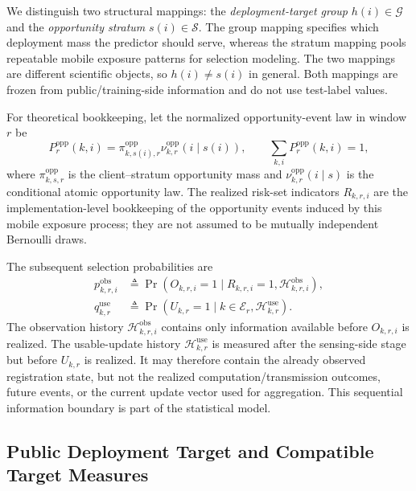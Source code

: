 \documentclass[letterpaper,journal]{IEEEtran}
\begin{document}
We distinguish two structural mappings: the \emph{deployment-target
group} $h(i)\in\mathcal{G}$ and the \emph{opportunity stratum}
$s(i)\in\mathcal{S}$.  The group mapping specifies which deployment
mass the predictor should serve, whereas the stratum mapping pools
repeatable mobile exposure patterns for selection modeling.  The two
mappings are different scientific objects, so $h(i)\neq s(i)$ in
general.  Both mappings are frozen from public/training-side
information and do not use test-label values.

For theoretical bookkeeping, let the normalized opportunity-event law in
window $r$ be
\begin{equation}
 P_r^{\mathrm{opp}}(k,i)
 =
 \pi^{\mathrm{opp}}_{k,s(i),r}
 \nu^{\mathrm{opp}}_{k,r}(i\mid s(i)),
 \qquad
 \sum_{k,i}P_r^{\mathrm{opp}}(k,i)=1,
 \label{eq:opp_event_law}
\end{equation}
where $\pi^{\mathrm{opp}}_{k,s,r}$ is the client--stratum opportunity mass and
$\nu^{\mathrm{opp}}_{k,r}(i\mid s)$ is the conditional atomic opportunity law.
The realized risk-set indicators $R_{k,r,i}$ are the implementation-level
bookkeeping of the opportunity events induced by this mobile exposure process;
they are not assumed to be mutually independent Bernoulli draws.

The subsequent selection probabilities are
\begin{align}
 p^{\mathrm{obs}}_{k,r,i}
 &\triangleq
 \Pr\!\left(
 O_{k,r,i}=1
 \mid
 R_{k,r,i}=1,\mathcal{H}^{\mathrm{obs}}_{k,r,i}
 \right),
 \label{eq:pobs_def}\\
 q^{\mathrm{use}}_{k,r}
 &\triangleq
 \Pr\!\left(
 U_{k,r}=1
 \mid
 k\in\mathcal{E}_r,\mathcal{H}^{\mathrm{use}}_{k,r}
 \right).
 \label{eq:quse_def}
\end{align}
The observation history $\mathcal{H}^{\mathrm{obs}}_{k,r,i}$ contains
only information available before $O_{k,r,i}$ is realized.  The
usable-update history $\mathcal{H}^{\mathrm{use}}_{k,r}$ is measured
after the sensing-side stage but before $U_{k,r}$ is realized.  It may
therefore contain the already observed registration state, but not the
realized computation/transmission outcomes, future events, or the
current update vector used for aggregation.  This sequential
information boundary is part of the statistical model.

\subsection{Public Deployment Target and Compatible Target Measures}
\label{subsec:target_measures}
\end{document}
